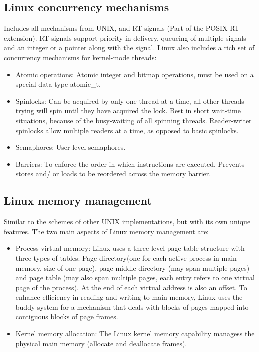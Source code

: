 \subsection{Linux concurrency mechanisms}
Includes all mechanisms from UNIX, and RT signals (Part of the POSIX RT extension). RT signals support priority in delivery, queueing of multiple signals and an integer or a pointer along with the signal.
Linux also includes a rich set of concurrency mechanisms for kernel-mode threads:
\begin{itemize}
    \item Atomic operations: Atomic integer and bitmap operations, must be used on a special data type atomic\_t.
    \item Spinlocks: Can be acquired by only one thread at a time, all other threads trying will spin until they have acquired the lock. Best in short wait-time situations, because of the busy-waiting of all spinning threads. Reader-writer spinlocks allow multiple readers at a time, as opposed to basic spinlocks.
    \item Semaphores: User-level semaphores.
    \item Barriers: To enforce the order in which instructions are executed. Prevents stores and/ or loads to be reordered across the memory barrier.
\end{itemize}

\subsection{Linux memory management}
Similar to the schemes of other UNIX implementations, but with its own unique features. The two main aspects of Linux memory management are:
\begin{itemize}
    \item Process virtual memory: Linux uses a three-level page table structure with three types of tables: Page directory(one for each active process in main memory, size of one page), page middle directory (may span multiple pages) and page table (may also span multiple pages, each entry refers to one virtual page of the process). At the end of each virtual address is also an offset. To enhance efficiency in reading and writing to main memory, Linux uses the buddy system for a mechanism that deals with blocks of pages mapped into contiguous blocks of page frames.
    \item Kernel memory allocation: The Linux kernel memory capability managess the physical main memory (allocate and deallocate frames).
\end{itemize}

